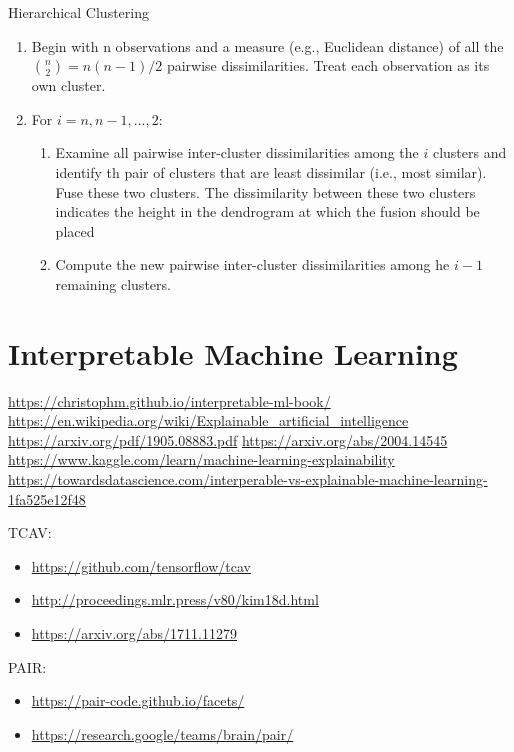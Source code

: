 \documentclass[
]{book}
\providecommand{\tightlist}{%
  \setlength{\itemsep}{0pt}\setlength{\parskip}{0pt}}
\begin{document}
Hierarchical Clustering

\begin{enumerate}
\def\labelenumi{\arabic{enumi}.}
\item
  Begin with n observations and a measure (e.g., Euclidean distance) of all the \(\binom{n}{2}= n(n-1)/2\) pairwise dissimilarities. Treat each observation as its own cluster.
\item
  For \(i = n, n-1, \dots, 2\):

  \begin{enumerate}
  \def\labelenumii{\arabic{enumii}.}
  \item
    Examine all pairwise inter-cluster dissimilarities among the \(i\) clusters and identify th pair of clusters that are least dissimilar (i.e., most similar). Fuse these two clusters. The dissimilarity between these two clusters indicates the height in the dendrogram at which the fusion should be placed
  \item
    Compute the new pairwise inter-cluster dissimilarities among he \(i-1\) remaining clusters.
  \end{enumerate}
\end{enumerate}

\hypertarget{interpretable-machine-learning}{%
\chapter{Interpretable Machine Learning}\label{interpretable-machine-learning}}

\url{https://christophm.github.io/interpretable-ml-book/}
\url{https://en.wikipedia.org/wiki/Explainable_artificial_intelligence}
\url{https://arxiv.org/pdf/1905.08883.pdf}
\url{https://arxiv.org/abs/2004.14545}
\url{https://www.kaggle.com/learn/machine-learning-explainability}
\url{https://towardsdatascience.com/interperable-vs-explainable-machine-learning-1fa525e12f48}

TCAV:

\begin{itemize}
\tightlist
\item
  \url{https://github.com/tensorflow/tcav}
\item
  \url{http://proceedings.mlr.press/v80/kim18d.html}
\item
  \url{https://arxiv.org/abs/1711.11279}
\end{itemize}

PAIR:

\begin{itemize}
\tightlist
\item
  \url{https://pair-code.github.io/facets/}
\item
  \url{https://research.google/teams/brain/pair/}
\end{itemize}
\end{document}
